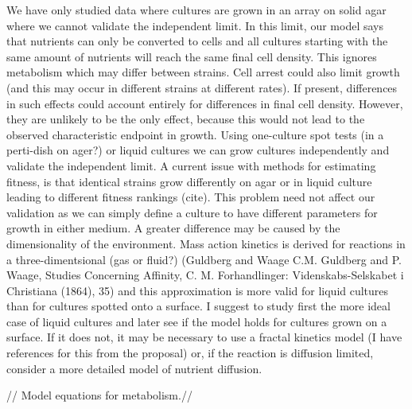 We have only studied data where cultures are grown in an array on
solid agar where we cannot validate the independent limit. In this
limit, our model says that nutrients can only be converted to cells
and all cultures starting with the same amount of nutrients will reach
the same final cell density. This ignores metabolism which may differ
between strains. Cell arrest could also limit growth (and this may
occur in different strains at different rates). If present,
differences in such effects could account entirely for differences in
final cell density. However, they are unlikely to be the only effect,
because this would not lead to the observed characteristic endpoint in
growth. Using one-culture spot tests (in a perti-dish on ager?) or
liquid cultures we can grow cultures independently and validate the
independent limit. A current issue with methods for estimating
fitness, is that identical strains grow differently on agar or in
liquid culture leading to different fitness rankings (cite). This
problem need not affect our validation as we can simply define a
culture to have different parameters for growth in either medium. A
greater difference may be caused by the dimensionality of the
environment. Mass action kinetics is derived for reactions in a
three-dimentsional (gas or fluid?) (Guldberg and Waage C.M. Guldberg
and P. Waage, Studies Concerning Affinity, C. M. Forhandlinger:
Videnskabs-Selskabet i Christiana (1864), 35) and this approximation
is more valid for liquid cultures than for cultures spotted onto a
surface. I suggest to study first the more ideal case of liquid
cultures and later see if the model holds for cultures grown on a
surface. If it does not, it may be necessary to use a fractal kinetics
model (I have references for this from the proposal) or, if the
reaction is diffusion limited, consider a more detailed model of
nutrient diffusion.

// Model equations for metabolism.//

